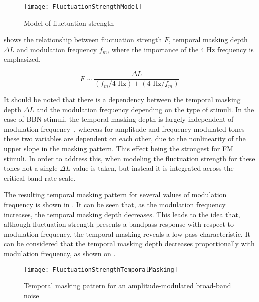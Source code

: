 \documentclass[../main.tex]{subfiles}
\begin{document}
\begin{theoreticalbackground}
\begin{figure}[!ht]
  \centering
  \texttt{[image: FluctuationStrengthModel]}
  \caption{Model of fluctuation
    strength~\cite[pp. 254]{Fastl2007Psychoacoustics}}
\label{fig:flucstrenmodel}
\end{figure}

 shows the relationship between fluctuation
strength $F$, temporal masking depth $\Delta L$ and modulation frequency
$f_{m}$, where the importance of the 4 Hz frequency is emphasized.

\begin{equation}
  F \sim \frac{\Delta L}{(f_{m}/4\text{ Hz}) + (4\text{ Hz}/f_{m})}
  \label{eq:flucstrentempmaskmodfreq}
\end{equation}

It should be noted that there is a dependency between the temporal masking depth
$\Delta L$ and the modulation frequency depending on the type of stimuli. In the
case of \gls{BBN} stimuli, the temporal masking depth is largely independent of
modulation frequency~\cite[pp.~254]{Fastl2007Psychoacoustics}, whereas for
amplitude and frequency modulated tones these two variables are dependent on
each other, due to the nonlinearity of the upper slope in the masking pattern.
This effect being the strongest for \gls{FM} stimuli. In order to address this,
when modeling the fluctuation strength for these tones not a single
$\Delta L$ value is taken, but instead it is integrated across the critical-band
rate scale.

The resulting temporal masking pattern for several values of modulation
frequency is shown in . It can be seen that, as the
modulation frequency increases, the temporal masking depth decreases. This leads
to the idea that, although fluctuation strength presents a bandpass response
with respect to modulation frequency, the temporal masking reveals a low pass
characteristic. It can be considered that the temporal masking depth decreases
proportionally with modulation frequency, as shown on
.

\begin{figure}[!ht]
  \centering
  \texttt{[image: FluctuationStrengthTemporalMasking]}
  \caption{Temporal masking pattern for an amplitude-modulated broad-band
    noise~\cite[pp. 255]{Fastl2007Psychoacoustics}}
\label{fig:flucstrenmasking}
\end{figure}


\end{theoreticalbackground}
\end{document}
